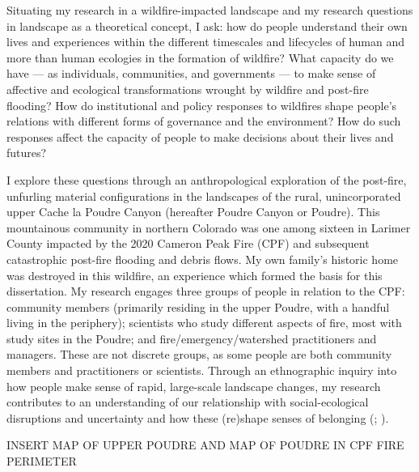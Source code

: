 \documentclass[
]{article}
\begin{document}
Situating my research in a wildfire-impacted landscape and my research questions in landscape as a theoretical concept, I ask: how do people understand their own lives and experiences within the different timescales and lifecycles of human and more than human ecologies in the formation of wildfire? What capacity do we have --- as individuals, communities, and governments --- to make sense of affective and ecological transformations wrought by wildfire and post-fire flooding? How do institutional and policy responses to wildfires shape people's relations with different forms of governance and the environment? How do such responses affect the capacity of people to make decisions about their lives and futures?

I explore these questions through an anthropological exploration of the post-fire, unfurling material configurations in the landscapes of the rural, unincorporated upper Cache la Poudre Canyon (hereafter Poudre Canyon or Poudre). This mountainous community in northern Colorado was one among sixteen in Larimer County impacted by the 2020 Cameron Peak Fire (CPF) and subsequent catastrophic post-fire flooding and debris flows. My own family's historic home was destroyed in this wildfire, an experience which formed the basis for this dissertation. My research engages three groups of people in relation to the CPF: community members (primarily residing in the upper Poudre, with a handful living in the periphery); scientists who study different aspects of fire, most with study sites in the Poudre; and fire/emergency/watershed practitioners and managers. These are not discrete groups, as some people are both community members and practitioners or scientists. Through an ethnographic inquiry into how people make sense of rapid, large-scale landscape changes, my research contributes to an understanding of our relationship with social-ecological disruptions and uncertainty and how these (re)shape senses of belonging (; ).

INSERT MAP OF UPPER POUDRE AND MAP OF POUDRE IN CPF FIRE PERIMETER
\end{document}
